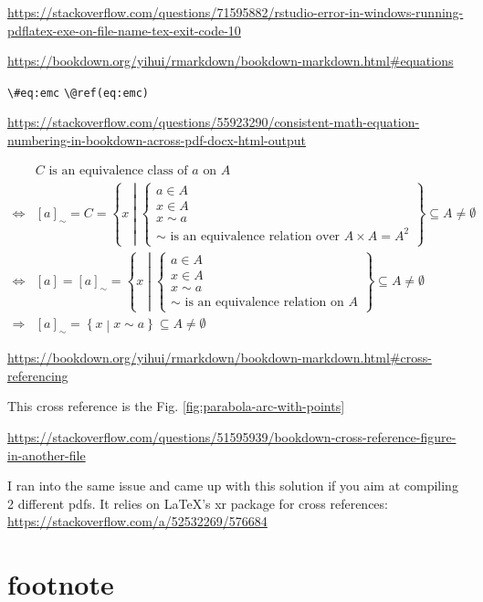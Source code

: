 \documentclass[
]{book}
\theoremstyle{definition}
\theoremstyle{definition}
\theoremstyle{definition}
\theoremstyle{definition}
\theoremstyle{remark}
\begin{document}
\url{https://stackoverflow.com/questions/71595882/rstudio-error-in-windows-running-pdflatex-exe-on-file-name-tex-exit-code-10}

\url{https://bookdown.org/yihui/rmarkdown/bookdown-markdown.html\#equations}

\texttt{\textbackslash{}\#eq:emc}
\texttt{\textbackslash{}@ref(eq:emc)}

\url{https://stackoverflow.com/questions/55923290/consistent-math-equation-numbering-in-bookdown-across-pdf-docx-html-output}

\begin{equation}
\begin{aligned}
 & C\text{ is an equivalence class of }a\text{ on }A\\
\Leftrightarrow & \left[a\right]_{\sim}=C=\left\{ x\middle|\begin{cases}
a\in A\\
x\in A\\
x\sim a\\
\sim\text{ is an equivalence relation over }A\times A=A^{2}
\end{cases}\right\} \subseteq A\ne\emptyset\\
\Leftrightarrow & \left[a\right]=\left[a\right]_{\sim}=\left\{ x\middle|\begin{cases}
a\in A\\
x\in A\\
x\sim a\\
\sim\text{ is an equivalence relation on }A
\end{cases}\right\} \subseteq A\ne\emptyset\\
\Rightarrow & \left[a\right]_{\sim}=\left\{ x\middle|x\sim a\right\} \subseteq A\ne\emptyset
\end{aligned}
\label{eq:eqclass}
\end{equation}

\url{https://bookdown.org/yihui/rmarkdown/bookdown-markdown.html\#cross-referencing}

This cross reference is the Fig. \ref{fig:parabola-arc-with-points}

\url{https://stackoverflow.com/questions/51595939/bookdown-cross-reference-figure-in-another-file}

I ran into the same issue and came up with this solution if you aim at compiling 2 different pdfs. It relies on LaTeX's xr package for cross references: \url{https://stackoverflow.com/a/52532269/576684}

\section{footnote}\label{footnote-1}
\end{document}
